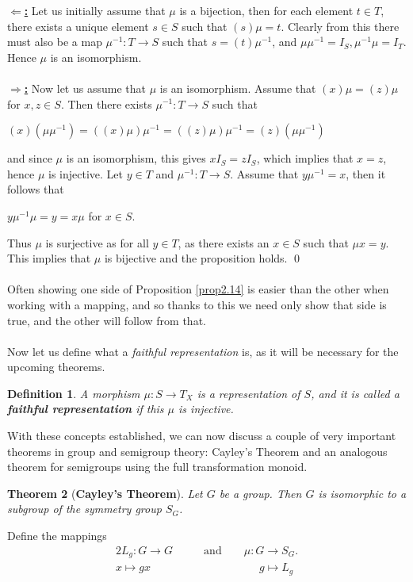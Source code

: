 \documentclass[12pt]{article}
\newtheorem{theorem}{Theorem}[subsection]
\newtheorem{defn}[theorem]{Definition}
\begin{document}
\proof
	\textbf{\underline{$\Leftarrow$:}}
		Let us initially assume that $\mu$ is a bijection, then for each element $t \in T$, there exists a unique element $s \in S$ such that $(s)\mu = t$. Clearly from this there must also be a map $\mu^{-1}:T \to S$ such that $s = (t)\mu^{-1}$, and $\mu\mu^{-1} = I_S, \mu^{-1}\mu = I_T$. Hence $\mu$ is an isomorphism.\\
	\\\textbf{\underline{$\Rightarrow$:}}
		Now let us assume that $\mu$ is an isomorphism. Assume that $(x)\mu = (z)\mu$ for $x, z \in S$. Then there exists $\mu^{-1}:T\to S$ such that
		\begin{center}
			$(x)(\mu\mu^{-1}) = ((x)\mu)\mu^{-1} = ((z)\mu)\mu^{-1} = (z)(\mu\mu^{-1})$
		\end{center}
		and since $\mu$ is an isomorphism, this gives $xI_S = zI_S$, which implies that $x = z$, hence $\mu$ is injective.
		Let $y \in T$ and $\mu^{-1}:T\to S$. Assume that $y\mu^{-1} = x$, then it follows that
		\begin{center}
			$y\mu^{-1}\mu = y = x\mu$	for $x \in S$.
		\end{center}
		Thus $\mu$ is surjective as for all $y \in T$, as there exists an $x \in S$ such that $\mu x = y$. This implies that $\mu$ is bijective and the proposition holds.
	\qed\\
\\Often showing one side of Proposition \ref{prop2.14} is easier than the other when working with a mapping, and so thanks to this we need only show that side is true, and the other will follow from that.\\
\\Now let us define what a \textit{faithful representation} is, as it will be necessary for the upcoming theorems.
\begin{defn}
	A morphism $\mu:S \to T_X$ is a representation of $S$, and it is called a \textbf{faithful representation} if this $\mu$ is injective.
\end{defn}
\noindent With these concepts established, we can now discuss a couple of very important theorems in group and semigroup theory: Cayley’s Theorem and an analogous theorem for semigroups using the full transformation monoid.
\begin{theorem}[\textbf{Cayley's Theorem}]
	Let $G$ be a group. Then $G$ is isomorphic to a subgroup of the symmetry group $S_G$.
\end{theorem}
\proof
	Define the mappings
		\begin{alignat*}{2}
			L_g:G \to G & \qquad	\text{and}\qquad 	\mu:G\to S_G.\\		
			x\mapsto gx & \qquad \qquad \qquad \quad g\mapsto L_g
		\end{alignat*}
\end{document}
